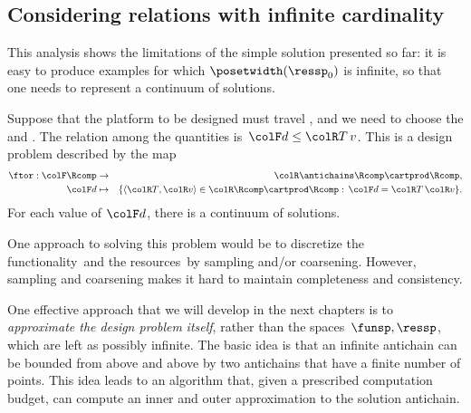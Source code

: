 \subsection{Considering relations with infinite cardinality}

This analysis shows the limitations of the simple solution presented so far: it is easy to produce examples for which $\posetwidth(\ressp_{0})$ is infinite, so that one needs to represent a continuum of solutions.

\begin{example}
    Suppose that the platform to be designed must travel , and we need to choose the  and .
    The relation among the quantities is~${\colF d}\leq{\colR T\,v}$.
    This is a design problem described by the map
    \begin{eqnarray*}
        \ftor:{\colF\Rcomp} & \rightarrow & {\colR\antichains\Rcomp\cartprod\Rcomp,}\\
        {\colF d} & \mapsto & \{\langle{\colR T},{\colR v}\rangle\in{\colR\Rcomp\cartprod\Rcomp}:\,{\colF d}={\colR T}\,{\colR v}\}.
    \end{eqnarray*}
    For each value of ${\colF d}$, there is a continuum of solutions.
\end{example}
One approach to solving this problem would be to discretize the functionality~\funsp and the resources~\ressp by sampling and/or coarsening.
However, sampling and coarsening makes it hard to maintain completeness and consistency.

One effective approach that we will develop in the next chapters is to \emph{approximate the design problem} \emph{itself}, rather than the spaces~$\funsp,\ressp$, which are left as possibly infinite.
The basic idea is that an infinite antichain can be bounded from above and above by two antichains that have a finite number of points.
This idea leads to an algorithm that, given a prescribed computation budget, can compute an inner and outer approximation to the solution antichain.

